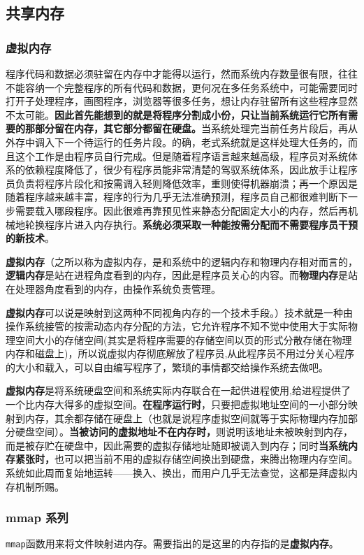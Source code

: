 \documentclass[UTF8,a4paper,8pt]{ctexbook}
\begin{document}
		\subsection{共享内存}
			\subsubsection{虚拟内存}
				程序代码和数据必须驻留在内存中才能得以运行，然而系统内存数量很有限，往往不能容纳一个完整程序的所有代码和数据，更何况在多任务系统中，可能需要同时打开子处理程序，画图程序，浏览器等很多任务，想让内存驻留所有这些程序显然不太可能。\textbf{因此首先能想到的就是将程序分割成小份，只让当前系统运行它所有需要的那部分留在内存，其它部分都留在硬盘。}当系统处理完当前任务片段后，再从外存中调入下一个待运行的任务片段。的确，老式系统就是这样处理大任务的，而且这个工作是由程序员自行完成。但是随着程序语言越来越高级，程序员对系统体系的依赖程度降低了，很少有程序员能非常清楚的驾驭系统体系，因此放手让程序员负责将程序片段化和按需调入轻则降低效率，重则使得机器崩溃；再一个原因是随着程序越来越丰富，程序的行为几乎无法准确预测，程序员自己都很难判断下一步需要载入哪段程序。因此很难再靠预见性来静态分配固定大小的内存，然后再机械地轮换程序片进入内存执行。\textbf{系统必须采取一种能按需分配而不需要程序员干预的新技术}。
				
				\textbf{虚拟内存}（之所以称为虚拟内存，是和系统中的逻辑内存和物理内存相对而言的，\textbf{逻辑内存}是站在进程角度看到的内存，因此是程序员关心的内容。而\textbf{物理内存}是站在处理器角度看到的内存，由操作系统负责管理。
				
				\textbf{虚拟内存}可以说是映射到这两种不同视角内存的一个技术手段。）技术就是一种由操作系统接管的按需动态内存分配的方法，它允许程序不知不觉中使用大于实际物理空间大小的存储空间(其实是将程序需要的存储空间以页的形式分散存储在物理内存和磁盘上)，所以说虚拟内存彻底解放了程序员,从此程序员不用过分关心程序的大小和载入，可以自由编写程序了，繁琐的事情都交给操作系统去做吧。

				\textbf{虚拟内存}是将系统硬盘空间和系统实际内存联合在一起供进程使用,给进程提供了一个比内存大得多的虚拟空间。\textbf{在程序运行时}，只要把虚拟地址空间的一小部分映射到内存，其余都存储在硬盘上（也就是说程序虚拟空间就等于实际物理内存加部分硬盘空间）。\textbf{当被访问的虚拟地址不在内存时，}则说明该地址未被映射到内存，而是被存贮在硬盘中，因此需要的虚拟存储地址随即被调入到内存；同时\textbf{当系统内存紧张时，}也可以把当前不用的虚拟存储空间换出到硬盘，来腾出物理内存空间。系统如此周而复始地运转——换入、换出，而用户几乎无法查觉，这都是拜虚拟内存机制所赐。
			\subsubsection{mmap 系列}
				\verb|mmap|函数用来将文件映射进内存。需要指出的是这里的内存指的是\textbf{虚拟内存}。
				
\end{document}
